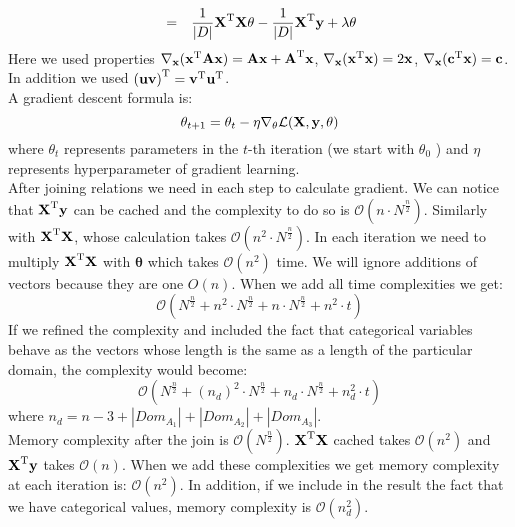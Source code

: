 \documentclass[10pt,a4paper]{article}
\begin{document}
\begin{enumerate}
\begin{eqnarray}
&=& \frac{1}{|D|}\textbf{\text{{X}}} ^ \text{T}\textbf{\text{{X}}}\mathbf{\theta} - \frac{1}{|D|}\textbf{\text{{X}}} ^ \text{T}\textbf{\text{{y}}} + \lambda \mathbf{\theta}\nonumber
\end{eqnarray}
Here we used properties $\nabla_{\textbf{\text{{\textbf{\text{{x}}}}}}}(\textbf{\text{{x}}} ^ \text{T}\textbf{\text{{A}}}\textbf{\text{{x}}})=\textbf{\text{{A}}}\textbf{\text{{x}}} + \textbf{\text{{A}}} ^ \text{T}\textbf{\text{{x}}}$, $\nabla_{\textbf{\text{{\textbf{\text{{x}}}}}}}(\textbf{\text{{x}}} ^ \text{T}\textbf{\text{{x}}})=2\textbf{\text{{x}}}$, $\nabla_{\textbf{\text{{\textbf{\text{{x}}}}}}}(\textbf{\text{{c}}} ^ \text{T} \textbf{\text{{x}}}) = \textbf{\text{{c}}}$. In addition we used $\left(\textbf{\text{{u}}} \textbf{\text{{v}}}\right) ^ \text{T} = \textbf{\text{{v}}} ^ \text{T}\textbf{\text{{u}}} ^ \text{T}$. \\
A gradient descent formula is:
$$\mathbf{\theta}_{t+1}=\mathbf{\theta}_t - \eta\nabla_{\mathbf{\theta}} \mathcal{L}(\textbf{\text{{X}}},\textbf{\text{{y}}}, \mathbf{\theta})$$
where $\theta_t$ represents parameters in the $t$-th iteration (we start with $\theta_0$ ) and $\eta$ represents hyperparameter of gradient learning.  
\\
After joining relations we need in each step to calculate gradient. 
We can notice that $\textbf{\text{{X}}} ^ \text{T}\textbf{\text{{y}}}$ can be cached and the complexity to do so is $\mathcal{O}(n \cdot N^\frac{n}{2})$. Similarly with $\textbf{\text{{X}}} ^ \text{T}\textbf{\text{{X}}}$, whose calculation takes $\mathcal{O}(n^2 \cdot N^\frac{n}{2})$. In each iteration we need to multiply $\textbf{\text{{X}}} ^ \text{T}\textbf{\text{{X}}}$ with $\mathbf{\theta}$ which takes $\mathcal{O}(n^2)$ time. We will ignore additions of vectors because they are one $O(n)$.   
When we add  all time complexities we get:
$$\mathcal{O}(N^\frac{n}{2} + n^2 \cdot N^\frac{n}{2} + n \cdot  N^\frac{n}{2} + n^2 \cdot t) $$
If we refined the complexity and included the fact that categorical variables behave as the vectors whose length is the same as a length of the particular domain, the complexity would become:
$$\mathcal{O}(N^\frac{n}{2} + (n_d)^2 \cdot N^\frac{n}{2} + n_d \cdot  N^\frac{n}{2} + n_d^2 \cdot t) $$
where $n_d= n - 3 +  |Dom_{A_1}|+|Dom_{A_2}| + |Dom_{A_3}|$.
\\Memory complexity after the join is
$\mathcal{O}(N^\frac{n}{2})$. $\textbf{\text{{X}}} ^ \text{T}\textbf{\text{{X}}}$ cached takes $\mathcal{O}(n^2)$ and $\textbf{\text{{X}}} ^ \text{T}\textbf{\text{{y}}}$ takes $\mathcal{O}(n)$.
When we add these complexities we get memory complexity at each iteration is:
$\mathcal{O}(n^2)$. In addition, if we include in the result the fact that we have categorical values, memory complexity is $\mathcal{O}(n_d^2)$. 


\end{enumerate}
\end{document}
